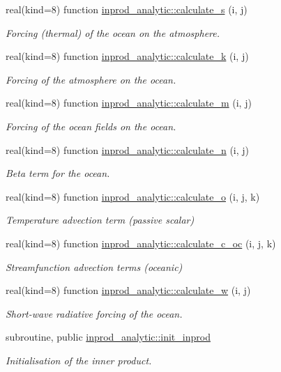 \begin{DoxyCompactItemize}
real(kind=8) function \hyperlink{namespaceinprod__analytic_a5cdb72e3766b95108cef81b2cff503f9}{inprod\+\_\+analytic\+::calculate\+\_\+s} (i, j)
\begin{DoxyCompactList}\small\item\em Forcing (thermal) of the ocean on the atmosphere. \end{DoxyCompactList}\item 
real(kind=8) function \hyperlink{namespaceinprod__analytic_a084d554f278704061269b6bdf0b85053}{inprod\+\_\+analytic\+::calculate\+\_\+k} (i, j)
\begin{DoxyCompactList}\small\item\em Forcing of the atmosphere on the ocean. \end{DoxyCompactList}\item 
real(kind=8) function \hyperlink{namespaceinprod__analytic_a745462230d6120d9486aa7cb724322f5}{inprod\+\_\+analytic\+::calculate\+\_\+m} (i, j)
\begin{DoxyCompactList}\small\item\em Forcing of the ocean fields on the ocean. \end{DoxyCompactList}\item 
real(kind=8) function \hyperlink{namespaceinprod__analytic_af3507292836d9e87909740e9d8a0f9bc}{inprod\+\_\+analytic\+::calculate\+\_\+n} (i, j)
\begin{DoxyCompactList}\small\item\em Beta term for the ocean. \end{DoxyCompactList}\item 
real(kind=8) function \hyperlink{namespaceinprod__analytic_ac8f50f326a84d5b206ed4cf5c86c4301}{inprod\+\_\+analytic\+::calculate\+\_\+o} (i, j, k)
\begin{DoxyCompactList}\small\item\em Temperature advection term (passive scalar) \end{DoxyCompactList}\item 
real(kind=8) function \hyperlink{namespaceinprod__analytic_aaa451a1ceea496bac284d4b71c06b4ee}{inprod\+\_\+analytic\+::calculate\+\_\+c\+\_\+oc} (i, j, k)
\begin{DoxyCompactList}\small\item\em Streamfunction advection terms (oceanic) \end{DoxyCompactList}\item 
real(kind=8) function \hyperlink{namespaceinprod__analytic_a3ce2bc9a209cef35849d78e829cfbe5a}{inprod\+\_\+analytic\+::calculate\+\_\+w} (i, j)
\begin{DoxyCompactList}\small\item\em Short-\/wave radiative forcing of the ocean. \end{DoxyCompactList}\item 
subroutine, public \hyperlink{namespaceinprod__analytic_a7491dd2b8ba26eb10d160eb0bf072e56}{inprod\+\_\+analytic\+::init\+\_\+inprod}
\begin{DoxyCompactList}\small\item\em Initialisation of the inner product. \end{DoxyCompactList}\end{DoxyCompactItemize}
